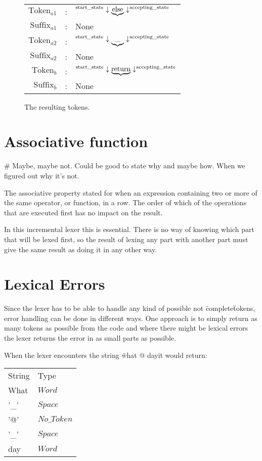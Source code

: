 \begin{example}
\begin{figure}[!h]
  \centering
  \begin{tabular}{r c l}
    $\text{Token}_{a1}$ & : & $\textsuperscript{start\_state} \downarrow
      \underbrace{ \text{else}} \downarrow ^{\text{accepting\_state} }$\\
    $\text{Suffix}_{a1}$ & : & None\\
    $\text{Token}_{a2}$ & : & $\textsuperscript{start\_state} \downarrow
      \underbrace{ \text{\_}} \downarrow ^{\text{accepting\_state} }$\\
    $\text{Suffix}_{a2}$ & : & None\\
    $\text{Token}_b$ & : & $\textsuperscript{start\_state} \downarrow
      \underbrace{ \text{return}} \downarrow ^{\text{accepting\_state}}$\\
    $\text{Suffix}_{b}$ & : & None
  \end{tabular}
  \caption{The resulting tokens.
    \label{fig.SepToken}}
\end{figure}

\end{example}

\section{Associative function}
\# Maybe, maybe not. Could be good to state why and maybe how. When we figured out why it's not.

The associative property stated for when an expression containing two or more of the same operator, or function, in a row. The order of which of the operations that are executed first has no impact on the result. 

In this incremental lexer this is essential. There is no way of knowing which part that will be lexed first, so the result of lexing any part with another part must give the same result as doing it in any other way.

\section{Lexical Errors}
Since the lexer has to be able to handle any kind of possible not \"complete\"
tokens, error handling can be done in different ways. One approach is to simply
return as many tokens as possible from the code and where there might be lexical
errors the lexer returns the error in as small parts as possible.
\begin{example} When the lexer encounters the
string \"what @ day\" it would return:
\begin{center}
\begin{tabular}{ll}
String & Type\\
What & $Word$\\
'\_' & $Space$\\
'@' & $No\_Token$\\
'\_' & $Space$\\
day & $Word$\\
\end{tabular}
\end{center}
\end{example}
